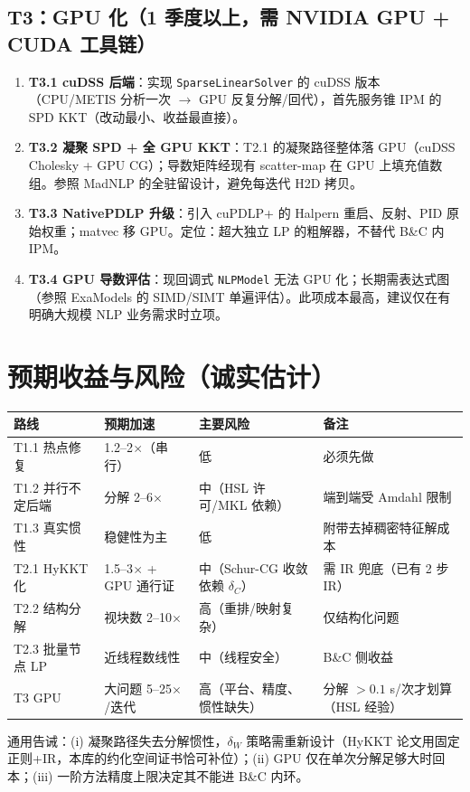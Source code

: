 \documentclass[11pt,a4paper]{ctexart}
\newcommand{\func}[1]{\texttt{#1}}
\begin{document}
\subsection{T3：GPU 化（1 季度以上，需 NVIDIA GPU + CUDA 工具链）}
\begin{enumerate}[leftmargin=2em]
  \item \textbf{T3.1 cuDSS 后端}：实现 \func{SparseLinearSolver} 的 cuDSS 版本（CPU/METIS 分析一次 $\to$ GPU 反复分解/回代），首先服务锥 IPM 的 SPD KKT（改动最小、收益最直接）。
  \item \textbf{T3.2 凝聚 SPD + 全 GPU KKT}：T2.1 的凝聚路径整体落 GPU（cuDSS Cholesky + GPU CG）；导数矩阵经现有 scatter-map 在 GPU 上填充值数组。参照 MadNLP 的全驻留设计，避免每迭代 H2D 拷贝。
  \item \textbf{T3.3 NativePDLP 升级}：引入 cuPDLP+ 的 Halpern 重启、反射、PID 原始权重；matvec 移 GPU。定位：超大独立 LP 的粗解器，不替代 B\&C 内 IPM。
  \item \textbf{T3.4 GPU 导数评估}：现回调式 \func{NLPModel} 无法 GPU 化；长期需表达式图（参照 ExaModels 的 SIMD/SIMT 单遍评估）。此项成本最高，建议仅在有明确大规模 NLP 业务需求时立项。
\end{enumerate}

\section{预期收益与风险（诚实估计）}
\begin{center}\footnotesize
\begin{tabular}{@{}llll@{}}
\toprule
路线 & 预期加速 & 主要风险 & 备注 \\
\midrule
T1.1 热点修复 & 1.2--2$\times$（串行） & 低 & 必须先做 \\
T1.2 并行不定后端 & 分解 2--6$\times$ & 中（HSL 许可/MKL 依赖） & 端到端受 Amdahl 限制 \\
T1.3 真实惯性 & 稳健性为主 & 低 & 附带去掉稠密特征解成本 \\
T2.1 HyKKT 化 & 1.5--3$\times$ + GPU 通行证 & 中（Schur-CG 收敛依赖 $\delta_C$） & 需 IR 兜底（已有 2 步 IR） \\
T2.2 结构分解 & 视块数 2--10$\times$ & 高（重排/映射复杂） & 仅结构化问题 \\
T2.3 批量节点 LP & 近线程数线性 & 中（线程安全） & B\&C 侧收益 \\
T3 GPU & 大问题 5--25$\times$/迭代 & 高（平台、精度、惯性缺失） & 分解 $>0.1$ s/次才划算（HSL 经验） \\
\bottomrule
\end{tabular}
\end{center}
通用告诫：(i) 凝聚路径失去分解惯性，$\delta_W$ 策略需重新设计（HyKKT 论文用固定正则+IR，本库的约化空间证书恰可补位）；(ii) GPU 仅在单次分解足够大时回本；(iii) 一阶方法精度上限决定其不能进 B\&C 内环。
\end{document}
